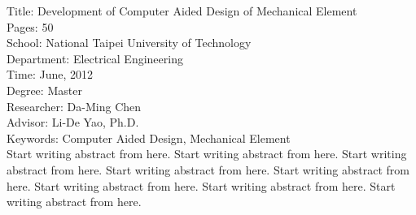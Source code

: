 \begin{abstractEN}

\noindent
Title: Development of Computer Aided Design of Mechanical Element\\
Pages: 50\\
School: National Taipei University of Technology\\
Department: Electrical Engineering\\
Time: June, 2012\\
Degree: Master\\
Researcher: Da-Ming Chen\\
Advisor: Li-De Yao, Ph.D.\\

\noindent
Keywords: Computer Aided Design, Mechanical Element\\


Start writing abstract from here. Start writing abstract from here. Start writing abstract from here. Start writing abstract from here. Start writing abstract from here. Start writing abstract from here. Start writing abstract from here. Start writing abstract from here.


\end{abstractEN}
